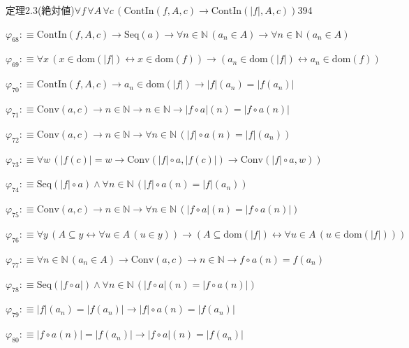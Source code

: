 \begin{fullproof}{定理2.3(絶対値)}{$\forall f\,\forall A\,\forall c\,(\mathrm{ContIn}(f,A,c) \to \mathrm{ContIn}(\lvert f \rvert,A,c))$}{394}
\begin{abbrevlist}
\item $\varphi_{68} :\equiv \mathrm{ContIn}(f,A,c) \to \mathrm{Seq}(a) \to \forall n \in \mathbb{N}\,(a_{n} \in A) \to \forall n \in \mathbb{N}\,(a_{n} \in A)$
\item $\varphi_{69} :\equiv \forall x\,(x \in \mathrm{dom}(\lvert f \rvert) \leftrightarrow x \in \mathrm{dom}(f)) \to (a_{n} \in \mathrm{dom}(\lvert f \rvert) \leftrightarrow a_{n} \in \mathrm{dom}(f))$
\item $\varphi_{70} :\equiv \mathrm{ContIn}(f,A,c) \to a_{n} \in \mathrm{dom}(\lvert f \rvert) \to \lvert f \rvert(a_{n}) = \lvert f(a_{n}) \rvert$
\item $\varphi_{71} :\equiv \mathrm{Conv}(a,c) \to n \in \mathbb{N} \to n \in \mathbb{N} \to \lvert f \circ a \rvert(n) = \lvert f \circ a(n) \rvert$
\item $\varphi_{72} :\equiv \mathrm{Conv}(a,c) \to n \in \mathbb{N} \to \forall n \in \mathbb{N}\,(\lvert f \rvert \circ a(n) = \lvert f \rvert(a_{n}))$
\item $\varphi_{73} :\equiv \forall w\,(\lvert f(c) \rvert = w \to \mathrm{Conv}(\lvert f \rvert \circ a,\lvert f(c) \rvert) \to \mathrm{Conv}(\lvert f \rvert \circ a,w))$
\item $\varphi_{74} :\equiv \mathrm{Seq}(\lvert f \rvert \circ a) \land \forall n \in \mathbb{N}\,(\lvert f \rvert \circ a(n) = \lvert f \rvert(a_{n}))$
\item $\varphi_{75} :\equiv \mathrm{Conv}(a,c) \to n \in \mathbb{N} \to \forall n \in \mathbb{N}\,(\lvert f \circ a \rvert(n) = \lvert f \circ a(n) \rvert)$
\item $\varphi_{76} :\equiv \forall y\,(A \subseteq y \leftrightarrow \forall u \in A\,(u \in y)) \to (A \subseteq \mathrm{dom}(\lvert f \rvert) \leftrightarrow \forall u \in A\,(u \in \mathrm{dom}(\lvert f \rvert)))$
\item $\varphi_{77} :\equiv \forall n \in \mathbb{N}\,(a_{n} \in A) \to \mathrm{Conv}(a,c) \to n \in \mathbb{N} \to f \circ a(n) = f(a_{n})$
\item $\varphi_{78} :\equiv \mathrm{Seq}(\lvert f \circ a \rvert) \land \forall n \in \mathbb{N}\,(\lvert f \circ a \rvert(n) = \lvert f \circ a(n) \rvert)$
\item $\varphi_{79} :\equiv \lvert f \rvert(a_{n}) = \lvert f(a_{n}) \rvert \to \lvert f \rvert \circ a(n) = \lvert f(a_{n}) \rvert$
\item $\varphi_{80} :\equiv \lvert f \circ a(n) \rvert = \lvert f(a_{n}) \rvert \to \lvert f \circ a \rvert(n) = \lvert f(a_{n}) \rvert$

\end{abbrevlist}
\end{fullproof}
